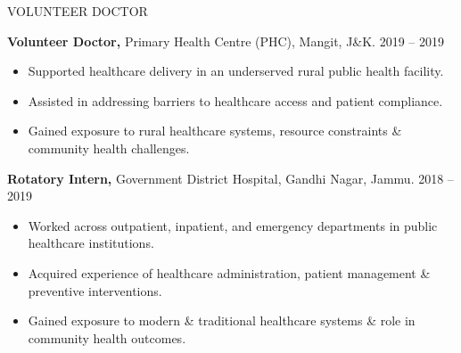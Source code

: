 \begin{rubric}{VOLUNTEER DOCTOR}

\entry*[]%
  \textbf{Volunteer Doctor,} Primary Health Centre (PHC), Mangit, J\&K. \hfill 2019 -- 2019
  \begin{itemize}[leftmargin=*, nosep, topsep=2pt]
    \item Supported healthcare delivery in an underserved rural public health facility.
    \item Assisted in addressing barriers to healthcare access and patient compliance.
    \item Gained exposure to rural healthcare systems, resource constraints \& community health challenges.
  \end{itemize}

\entry*[]%
  \textbf{Rotatory Intern,} Government District Hospital, Gandhi Nagar, Jammu. \hfill 2018 -- 2019
  \begin{itemize}[leftmargin=*, nosep, topsep=2pt]
    \item Worked across outpatient, inpatient, and emergency departments in public healthcare institutions.
    \item Acquired experience of healthcare administration, patient management \& preventive interventions.
    \item Gained exposure to modern \& traditional healthcare systems \& role in community health outcomes.
  \end{itemize}

\end{rubric}